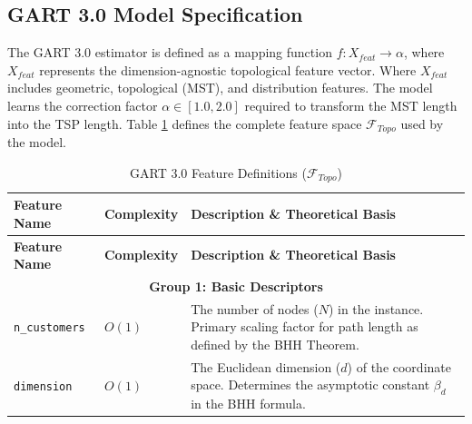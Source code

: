 \documentclass{article}
\begin{document}
\subsection{GART 3.0 Model Specification}
\label{subsec:gart3_spec}

The GART 3.0 estimator is defined as a mapping function $f: X_{feat} \to \alpha$, where $X_{feat}$ represents the dimension-agnostic topological feature vector.  Where $X_{feat}$ includes geometric, topological (MST), and distribution features. The model learns the correction factor $\alpha \in [1.0, 2.0]$ required to transform the MST length into the TSP length. Table \ref{tab:gart_features} defines the complete feature space $\mathcal{F}_{Topo}$ used by the model.

\begin{longtable}{p{4cm} p{2.5cm} p{8.5cm}}
\caption{GART 3.0 Feature Definitions ($\mathcal{F}_{Topo}$)} \label{tab:gart_features} \\
\toprule
\textbf{Feature Name} & \textbf{Complexity} & \textbf{Description \& Theoretical Basis} \\
\midrule
\endfirsthead

\toprule
\textbf{Feature Name} & \textbf{Complexity} & \textbf{Description \& Theoretical Basis} \\
\midrule
\endhead

\multicolumn{3}{c}{\textbf{Group 1: Basic Descriptors}} \\
\midrule
\texttt{n\_customers} & $O(1)$ & The number of nodes ($N$) in the instance. Primary scaling factor for path length as defined by the BHH Theorem. \\
\texttt{dimension} & $O(1)$ & The Euclidean dimension ($d$) of the coordinate space. Determines the asymptotic constant $\beta_d$ in the BHH formula. \\
\midrule


\end{longtable}
\end{document}
